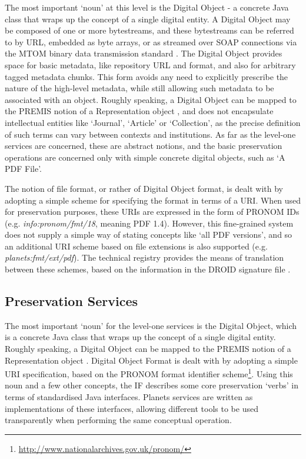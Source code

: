 \documentclass{article}
\begin{document}
The most important `noun' at this level is the Digital Object - a concrete Java
class that wraps up the concept of a single digital entity. A Digital Object may
be composed of one or more bytestreams, and these bytestreams can be referred to
by URL, embedded as byte arrays, or as streamed over SOAP connections via the
MTOM binary data transmission standard \cite{std-mtom}. The Digital Object
provides space for basic metadata, like repository URL and format, and also for
arbitrary tagged metadata chunks. This form avoids any need to explicitly
prescribe the nature of the high-level metadata, while still allowing such
metadata to be associated with an object. Roughly speaking, a Digital Object can
be mapped to the PREMIS notion of a Representation object \cite{std-premis}, and
does not encapsulate intellectual entities like `Journal', `Article' or
`Collection', as the precise definition of such terms can vary between contexts
and institutions. As far as the level-one services are concerned, these are
abstract notions, and the basic preservation operations are concerned only with
simple concrete digital objects, such as `A PDF File'.

The notion of file format, or rather of Digital Object format, is dealt with by
adopting a simple scheme for specifying the format in terms of a URI.  When used
for preservation purposes, these URIs are expressed in the form of PRONOM IDs
(e.g. \emph{info:pronom/fmt/18}, meaning PDF 1.4). However, this fine-grained
system does not supply a simple way of stating concepts like `all PDF versions',
and so an additional URI scheme based on file extensions is also supported (e.g.
\emph{planets:fmt/ext/pdf}). The technical registry provides the means of
translation between these schemes, based on the information in the DROID
signature file \cite{sw-droid,ws-pronom}.

\subsection{Preservation Services}
The most important `noun' for the level-one services is the Digital Object, which
is a concrete Java class that wraps up the concept of a single digital entity.
Roughly speaking, a Digital Object can be mapped to the PREMIS notion of a
Representation object \cite{std-premis}. Digital Object Format is dealt with by
adopting a simple URI specification, based on the PRONOM format identifier
scheme\footnote{\url{http://www.nationalarchives.gov.uk/pronom/}}. Using this
noun and a few other concepts, the IF describes some core preservation `verbs' in
terms of standardised Java interfaces.  Planets services are written as
implementations of these interfaces, allowing different tools to be used
transparently when performing the same conceptual operation.
\end{document}
